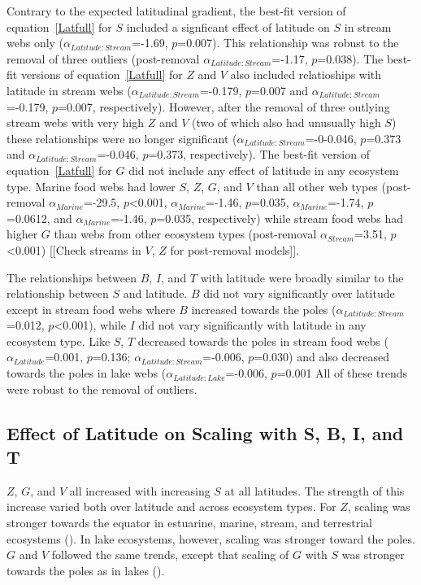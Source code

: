 \documentclass[12pt]{article}
\begin{document}
  Contrary to the expected latitudinal gradient, the best-fit version of
  equation~\ref{Latfull} for $S$ included a signficant effect of latitude on $S$
  in stream webs only ($\alpha_{Latitude:Stream}$=-1.69, $p$=0.007).  This
  relationship was robust to the removal of three outliers (post-removal
  $\alpha_{Latitude:Stream}$=-1.17, $p$=0.038). The best-fit versions of
  equation~\ref{Latfull} for $Z$ and $V$ also included relatioships with
  latitude in stream webs ($\alpha_{Latitude:Stream}$=-0.179, $p$=0.007 and
  $\alpha_{Latitude:Stream}$=-0.179, $p$=0.007, respectively). However, after
  the removal of three outlying stream webs with very high $Z$ and $V$ (two of
  which also had unusually high $S$) these relationships were no longer
  significant ($\alpha_{Latitude:Stream}$=-0-0.046, $p$=0.373 and
  $\alpha_{Latitude:Stream}$=-0.046, $p$=0.373, respectively). The best-fit
  version of equation~\ref{Latfull} for $G$ did not include any effect of
  latitude in any ecosystem type. Marine food webs
  had lower $S$, $Z$, $G$, and $V$ than all other web types (post-removal
  $\alpha_{Marine}$=-29.5, $p$\textless0.001, $\alpha_{Marine}$=-1.46,
  $p$=0.035, $\alpha_{Marine}$=-1.74, $p$=0.0612, and $\alpha_{Marine}$=-1.46,
  $p$=0.035, respectively) while stream food webs had higher $G$ than webs from
  other ecosystem types (post-removal $\alpha_{Stream}$=3.51,
  $p$\textless0.001) [[Check streams in $V$, $Z$ for post-removal models]].


  The relationships between $B$, $I$, and $T$ with latitude were broadly similar
  to the relationship between $S$ and latitude. $B$ did not vary significantly
  over latitude except in stream food webs where $B$ increased towards the poles
  ($\alpha_{Latitude:Stream}$=0.012, $p$\textless0.001), while $I$ did not vary
  significantly with latitude in any ecosystem type. Like $S$, $T$ decreased
  towards the poles in stream food webs ($\alpha_{Latitude}$=0.001, $p$=0.136;
  $\alpha_{Latitude:Stream}$=-0.006, $p$=0.030) and also decreased towards the
  poles in lake webs ($\alpha_{Latitude:Lake}$=-0.006, $p$=0.001
  All of these trends were robust to the removal of outliers.


\subsection*{Effect of Latitude on Scaling with S, B, I, and T}

$Z$, $G$, and $V$ all increased with increasing $S$ at all latitudes. The strength of
this increase varied both over latitude and across ecosystem types. For $Z$,
scaling was stronger towards the equator in estuarine, marine, stream, and
terrestrial ecosystems (). In lake ecosystems, however, scaling was stronger
toward the poles. $G$ and $V$ followed the same trends, except that scaling of $G$
with $S$ was stronger towards the poles as in lakes ().
\end{document}
